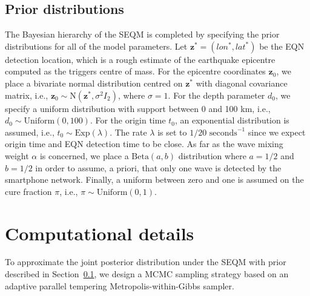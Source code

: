 \documentclass[final]{statsoc}
\begin{document}
\subsection{Prior distributions}\label{sec:prior}

The Bayesian hierarchy of the SEQM is completed by specifying the prior distributions for all of the model parameters. Let $\mathbf{z}^{\ast} = (lon^{\ast},lat^{\ast})$ be the EQN detection location,  which is a rough estimate of the earthquake epicentre computed as the triggers centre of mass. For the epicentre coordinates $\mathbf{z}_{0}$, we place a bivariate normal distribution centred on $\mathbf{z}^{\ast}$ with diagonal covariance matrix, i.e., $\mathbf{z}_{0}\sim \mbox{N}\left(\mathbf{z}^{\ast}, \sigma^2 I_{2}\right)$, where $\sigma=1$. For the depth parameter $d_{0}$, we specify a uniform distribution with support between 0 and 100 km, i.e., $d_{0}\sim \text{Uniform}(0, 100)$. For the origin time $t_{0}$, an exponential distribution is assumed, i.e., $t_0 \sim \mbox{Exp}(\lambda)$. The rate $\lambda$ is set to $1/20 \text{ seconds}^{-1}$ since we expect origin time and EQN detection time to be close. As far as the wave mixing weight $\alpha$ is concerned, we place a  $\mbox{Beta}(a, b)$ distribution where $a=1/2$ and $b=1/2$ in order to assume, a priori, that only one wave is detected by the smartphone network. Finally, a uniform between zero and one is assumed on the cure fraction $\pi$, i.e., $\pi \sim \mbox{Uniform}(0,1)$.

\section{Computational details}\label{sec:comp_det}

To approximate the joint posterior distribution under the SEQM with prior described in Section~\ref{sec:prior}, we design a MCMC sampling strategy based on an adaptive parallel tempering Metropolis-within-Gibbs sampler. 
\end{document}

